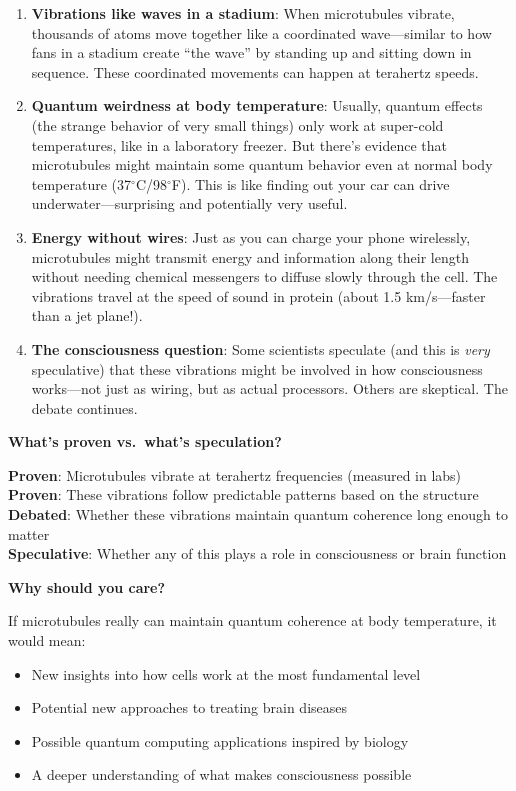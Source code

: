 \begin{enumerate}
\def\labelenumi{\arabic{enumi}.}
\item
  \textbf{Vibrations like waves in a stadium}: When microtubules
  vibrate, thousands of atoms move together like a coordinated
  wave---similar to how fans in a stadium create ``the wave'' by
  standing up and sitting down in sequence. These coordinated movements
  can happen at terahertz speeds.
\item
  \textbf{Quantum weirdness at body temperature}: Usually, quantum
  effects (the strange behavior of very small things) only work at
  super-cold temperatures, like in a laboratory freezer. But
  there's evidence that microtubules might maintain some
  quantum behavior even at normal body temperature
  (37$^{\circ}$C/98$^{\circ}$F). This
  is like finding out your car can drive underwater---surprising and
  potentially very useful.
\item
  \textbf{Energy without wires}: Just as you can charge your phone
  wirelessly, microtubules might transmit energy and information along
  their length without needing chemical messengers to diffuse slowly
  through the cell. The vibrations travel at the speed of sound in
  protein (about 1.5 km/s---faster than a jet plane!).
\item
  \textbf{The consciousness question}: Some scientists speculate (and
  this is \emph{very} speculative) that these vibrations might be
  involved in how consciousness works---not just as wiring, but as
  actual processors. Others are skeptical. The debate continues.
\end{enumerate}

\textbf{What's proven vs.~what's
speculation?}

\textbf{Proven}: Microtubules vibrate at terahertz frequencies (measured
in labs)\\
\textbf{Proven}: These vibrations follow predictable patterns based on
the structure\\
\textbf{Debated}: Whether these vibrations maintain quantum coherence
long enough to matter\\
\textbf{Speculative}: Whether any of this plays a role in consciousness
or brain function

\textbf{Why should you care?}

If microtubules really can maintain quantum coherence at body
temperature, it would mean:
\begin{itemize}
\item New insights into how cells work at the most fundamental level
\item Potential new approaches to treating brain diseases
\item Possible quantum computing applications inspired by biology
\item A deeper understanding of what makes consciousness possible
\end{itemize}

